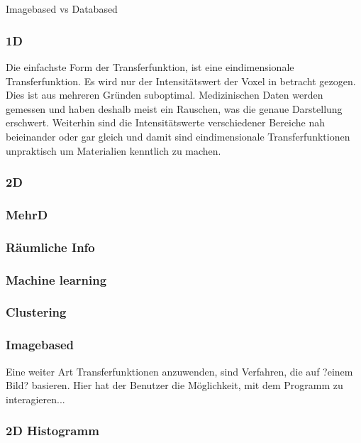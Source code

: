 \chapter{}
\label{sec:state_of_the_art}




Imagebased vs Databased


\subsection{1D}
Die einfachste Form der Transferfunktion, ist eine eindimensionale Transferfunktion. Es wird nur der Intensitätswert der Voxel in betracht gezogen. Dies ist aus mehreren Gründen suboptimal. Medizinischen Daten werden gemessen und haben deshalb meist ein Rauschen, was die genaue Darstellung erschwert. Weiterhin sind die Intensitätswerte verschiedener Bereiche nah beieinander oder gar gleich und damit sind eindimensionale Transferfunktionen unpraktisch um Materialien kenntlich zu machen.
\subsection{2D}
\subsection{MehrD}
\subsection{Räumliche Info}
\subsection{Machine learning}
\subsection{Clustering}
\subsection{Imagebased}
Eine weiter Art Transferfunktionen anzuwenden, sind Verfahren, die auf ?einem Bild? basieren. Hier hat der Benutzer die Möglichkeit, mit dem Programm zu interagieren...




\subsection{2D Histogramm}

